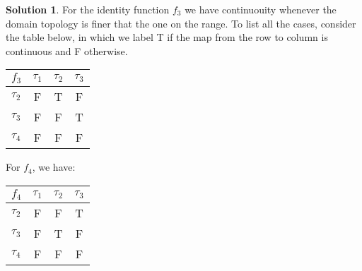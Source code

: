 \documentclass{article}
\theoremstyle{definition}
\newtheorem*{soln}{Solution}
\theoremstyle{theorem}
\begin{document}
\begin{soln}
    For the identity function $f_3$ we have continuouity whenever the domain topology is finer that the one on the range. To list all the cases, consider the table below, in which we label T  if the map from the row to column is continuous and F otherwise.
    \begin{center}
\begin{tabular}{|l|c|c|c|}
    \hline
$f_3$    & $\tau_1$ & $\tau_2$ & $\tau_3$\\
         \hline
$\tau_2$ &   F      &   T      &   F     \\
         \hline
$\tau_3$ &   F      &   F      &   T     \\
         \hline
$\tau_4$ &   F      &   F      &   F     \\
         \hline
\end{tabular}
    \end{center}

 For $f_4$, we have:
    \begin{center}
\begin{tabular}{|l|c|c|c|}
    \hline
$f_4$    & $\tau_1$ & $\tau_2$ & $\tau_3$\\
         \hline
$\tau_2$ &   F      &   F      &   T     \\
         \hline
$\tau_3$ &   F      &   T      &   F     \\
         \hline
$\tau_4$ &   F      &   F      &   F     \\
         \hline
\end{tabular}
    \end{center}
\end{soln}
\vspace{1in}
\end{document}
